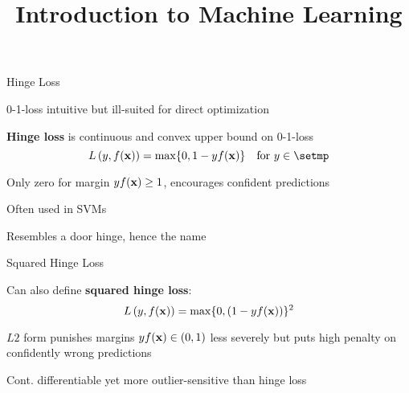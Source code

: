 \documentclass[11pt,compress,t,notes=noshow, xcolor=table]{beamer}
\title{Introduction to Machine Learning}
\begin{document}
    

\begin{framei}[sep=M]{Hinge Loss}

\item 0-1-loss intuitive but ill-suited for direct optimization
\item \textbf{Hinge loss} is continuous and convex 
upper bound on 0-1-loss 
$$\Lxy = \max \{ 0, 1 - \yf \} \quad \text{for} \ y \in \setmp$$
\item Only zero for margin $y f(\mathbf{x})\geq 1$, 
encourages confident predictions
\item Often used in SVMs
\item Resembles a door hinge, hence the name


\end{framei}


\begin{framei}[sep=M]{Squared Hinge Loss}

\item Can also define \textbf{squared hinge loss}:
$$L\left(y, f(\mathbf{x})\right) = \max \{ 0, (1 - y f(\mathbf{x}))\}^2$$
\item $L2$ form punishes margins $y f(\mathbf{x}) \in (0, 1)$ less severely but puts high penalty on confidently wrong predictions
\item Cont. differentiable yet more outlier-sensitive than hinge loss



\end{framei}
\end{document}
